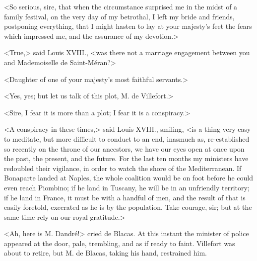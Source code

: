 <So serious, sire, that when the circumstance surprised me in the midst of a family festival, on the very day of my betrothal, I left my bride and friends, postponing everything, that I might hasten to lay at your majesty's feet the fears which impressed me, and the assurance of my devotion.> 

 <True,> said Louis XVIII., <was there not a marriage engagement between you and Mademoiselle de Saint-Méran?> 

 <Daughter of one of your majesty's most faithful servants.> 

 <Yes, yes; but let us talk of this plot, M. de Villefort.> 

 <Sire, I fear it is more than a plot; I fear it is a conspiracy.> 

 <A conspiracy in these times,> said Louis XVIII., smiling, <is a thing very easy to meditate, but more difficult to conduct to an end, inasmuch as, re-established so recently on the throne of our ancestors, we have our eyes open at once upon the past, the present, and the future. For the last ten months my ministers have redoubled their vigilance, in order to watch the shore of the Mediterranean. If Bonaparte landed at Naples, the whole coalition would be on foot before he could even reach Piombino; if he land in Tuscany, he will be in an unfriendly territory; if he land in France, it must be with a handful of men, and the result of that is easily foretold, execrated as he is by the population. Take courage, sir; but at the same time rely on our royal gratitude.> 

 <Ah, here is M. Dandré!> cried de Blacas. At this instant the minister of police appeared at the door, pale, trembling, and as if ready to faint. Villefort was about to retire, but M. de Blacas, taking his hand, restrained him. 